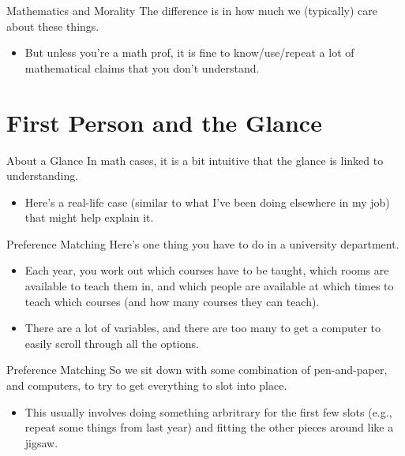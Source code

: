 \documentclass[
  17pt,
  letterpaper,
  ignorenonframetext,
  aspectratio=169,
]{beamer}
\providecommand{\tightlist}{%
  \setlength{\itemsep}{0pt}\setlength{\parskip}{0pt}}\usepackage{longtable,booktabs,array}
\begin{document}
\begin{frame}{Mathematics and Morality}
\protect\hypertarget{mathematics-and-morality-3}{}
The difference is in how much we (typically) care about these things.

\begin{itemize}[<+->]
\tightlist
\item
  But unless you're a math prof, it is fine to know/use/repeat a lot of
  mathematical claims that you don't understand.
\end{itemize}
\end{frame}

\hypertarget{first-person-and-the-glance}{%
\section{First Person and the
Glance}\label{first-person-and-the-glance}}

\begin{frame}{About a Glance}
\protect\hypertarget{about-a-glance}{}
In math cases, it is a bit intuitive that the glance is linked to
understanding.

\begin{itemize}[<+->]
\tightlist
\item
  Here's a real-life case (similar to what I've been doing elsewhere in
  my job) that might help explain it.
\end{itemize}
\end{frame}

\begin{frame}{Preference Matching}
\protect\hypertarget{preference-matching}{}
Here's one thing you have to do in a university department.

\begin{itemize}[<+->]
\tightlist
\item
  Each year, you work out which courses have to be taught, which rooms
  are available to teach them in, and which people are available at
  which times to teach which courses (and how many courses they can
  teach).
\item
  There are a lot of variables, and there are too many to get a computer
  to easily scroll through all the options.
\end{itemize}
\end{frame}

\begin{frame}{Preference Matching}
\protect\hypertarget{preference-matching-1}{}
So we sit down with some combination of pen-and-paper, and computers, to
try to get everything to slot into place.

\begin{itemize}[<+->]
\tightlist
\item
  This usually involves doing something arbritrary for the first few
  slots (e.g., repeat some things from last year) and fitting the other
  pieces around like a jigsaw.
\end{itemize}
\end{frame}
\end{document}

